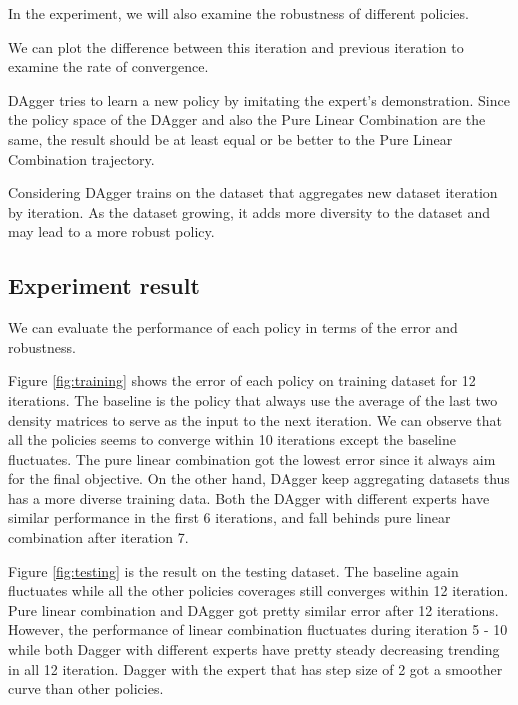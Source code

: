 \documentclass[twoside]{article}
\begin{document}
 In the experiment, we will also examine the robustness of different policies.


We can plot the difference between this iteration and previous iteration to examine the rate of convergence.


DAgger tries to learn a new policy by imitating the expert's demonstration. Since the policy space of the DAgger and also the Pure Linear Combination are the same, the result should be at least equal or be better to the Pure Linear Combination trajectory. 
 
Considering DAgger trains on the dataset that aggregates new dataset iteration by iteration. As the dataset growing, it adds more diversity to the dataset and may lead to a more robust policy.

\subsection{Experiment result}


We can evaluate the performance of each policy in terms of the error and robustness. 

Figure \ref{fig:training} shows the error of each policy on training dataset for 12 iterations. The baseline is the policy that always use the average of the last two density matrices to serve as the input to the next iteration.  We can observe that all the policies seems to  converge within 10 iterations except the baseline fluctuates. The pure linear combination got the lowest error since it always aim for the final objective. On the other hand, DAgger keep aggregating datasets thus has a more diverse training data. Both the DAgger with different experts have similar performance in the first 6 iterations, and fall behinds pure linear combination after iteration 7. 

Figure \ref{fig:testing} is the result  on the testing dataset.
The baseline again fluctuates while all the other policies coverages still converges within 12 iteration. 
Pure linear combination and DAgger got pretty similar error after 12 iterations. However, the performance of linear combination fluctuates during iteration 5 - 10 while both Dagger with different experts have pretty steady decreasing trending in all 12 iteration. Dagger with the expert that has step size of 2 got a smoother curve than other policies.
\end{document}
